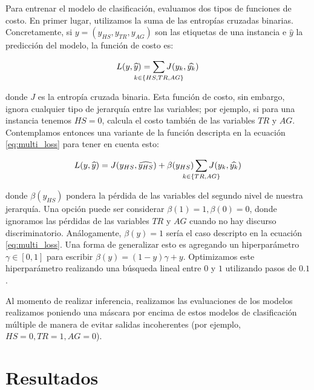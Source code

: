 Para entrenar el modelo de clasificación, evaluamos dos tipos de funciones de costo. En primer lugar, utilizamos la suma de las entropías cruzadas binarias. Concretamente, si $y = (y_{HS}, y_{TR}, y_{AG})$ son las etiquetas de una instancia e $\widehat{y}$ la predicción del modelo, la función de costo es:

\begin{equation}
\label{eq:multi_loss}
L(y, \widehat{y}) = \sum\limits_{\mathclap{k \in \{HS, TR, AG\}}} J(y_k, \widehat{y_k})
\end{equation}

\noindent donde $J$ es la entropía cruzada binaria. Esta función de costo, sin embargo, ignora cualquier tipo de jerarquía entre las variables; por ejemplo, si para una instancia tenemos $HS = 0$, calcula el costo también de las variables $TR$ y $AG$. Contemplamos entonces una variante de la función descripta en la ecuación \ref{eq:multi_loss} para tener en cuenta esto:

\begin{equation}
    \label{eq:hierarchical_loss}
    L(y, \widehat{y}) =  J(y_{HS}, \widehat{y_{HS}}) + \beta(y_{HS})\sum\limits_{\mathclap{k \in \{TR, AG\}}} J(y_k, \widehat{y_k})
\end{equation}

\noindent donde $\beta(y_{HS})$ pondera la pérdida de las variables del segundo nivel de nuestra jerarquía. Una opción puede ser considerar $\beta(1) = 1, \beta(0) = 0$, donde ignoramos las pérdidas de las variables $TR$ y $AG$ cuando no hay discurso discriminatorio. Análogamente, $\beta(y) = 1$ sería el caso descripto en la ecuación \ref{eq:multi_loss}. Una forma de generalizar esto es agregando un hiperparámetro $\gamma \in [0, 1]$ para escribir $\beta(y) = (1-y) \gamma + y$. Optimizamos este hiperparámetro realizando una búsqueda lineal entre $0$ y $1$ utilizando pasos de $0.1$.

Al momento de realizar inferencia, realizamos las evaluaciones de los modelos realizamos poniendo una máscara por encima de estos modelos de clasificación múltiple de manera de evitar salidas incoherentes (por ejemplo, $HS = 0, TR = 1, AG= 0$).


\section{Resultados}

\newcommand{\esrow}[1]{\multirow{#1}{*}{es}}
\newcommand{\enrow}[1]{\multirow{#1}{*}{en}}

